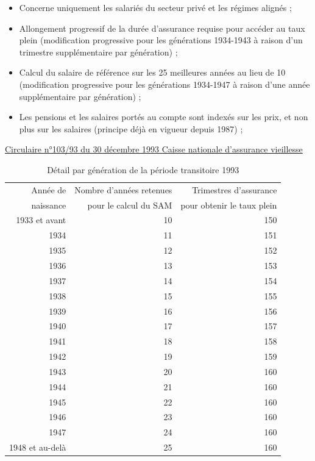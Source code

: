 \begin{itemize}
\item	Concerne uniquement les salariés du secteur privé et les régimes alignés ;
\item Allongement progressif de la durée d'assurance requise pour accéder au taux plein (modification progressive pour les générations 1934-1943 à raison d'un trimestre supplémentaire par génération) ;
\item	Calcul du salaire de référence sur les 25 meilleures années au lieu de 10 (modification progressive pour les générations 1934-1947 à raison d'une année supplémentaire par génération) ;
\item	Les pensions et les salaires portés au compte sont indexés sur les prix, et non plus sur les salaires (principe déjà en vigueur depuis 1987) ;
\end{itemize}
\href{http://www.legislation.cnav.fr/textes/cr/cn/TLR-CR_CN_10393_30121993.htm#323}%
{Circulaire n°103/93 du 30 décembre 1993 Caisse nationale d'assurance vieillesse}
\begin{table}[h]
  \centering
  \caption{Détail par génération de la période transitoire 1993}
    \begin{tabular}{rrr}
    \toprule
    Année de  & Nombre d'années retenues & Trimestres d'assurance  \\
    naissance & pour le calcul du SAM    & pour obtenir le taux plein \\
    \midrule
    1933 et avant & 10    & 150 \\
    1934  & 11    & 151 \\
    1935  & 12    & 152 \\
    1936  & 13    & 153 \\
    1937  & 14    & 154 \\
    1938  & 15    & 155 \\
    1939  & 16    & 156 \\
    1940  & 17    & 157 \\
    1941  & 18    & 158 \\
    1942  & 19    & 159 \\
    1943  & 20    & 160 \\
    1944  & 21    & 160 \\
    1945  & 22    & 160 \\
    1946  & 23    & 160 \\
    1947  & 24    & 160 \\
    1948 et au-delà & 25    & 160 \\
    \bottomrule
    \end{tabular}%
  \label{tab:addlabel}%
\end{table}%



